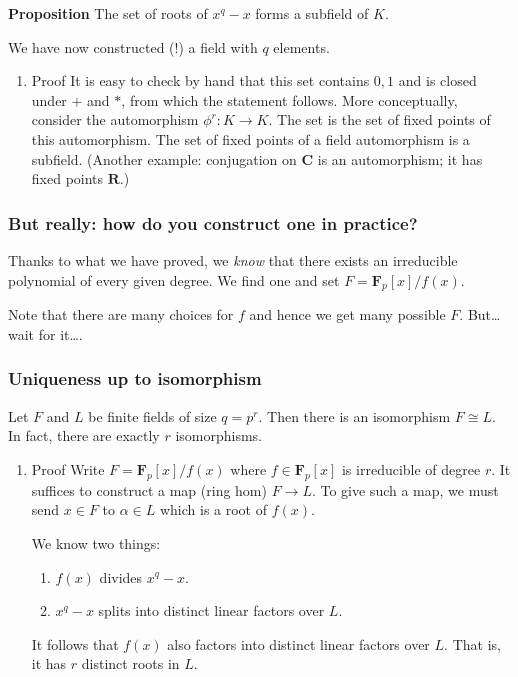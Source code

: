 \documentclass[11pt]{article}
\begin{document}
\textbf{\textbf{Proposition}} The set of roots of \(x^q-x\) forms a subfield of \(K\).

We have now constructed (!) a field with \(q\) elements.
\begin{enumerate}
\item Proof
\label{sec:org587a35f}
It is easy to check by hand that this set contains \(0,1\) and is closed under \(+\) and \(*\), from which the statement follows.
More conceptually, consider the automorphism \(\phi^r \colon K \to K\).  The set is the set of fixed points of this automorphism.
The set of fixed points of a field automorphism is a subfield.
(Another example: conjugation on \(\mathbf{C}\) is an automorphism; it has fixed points \(\mathbf{R}\).)
\end{enumerate}
\subsubsection{But really: how do you construct one in practice?}
\label{sec:orga20d96f}
Thanks to what we have proved, we \emph{know} that there exists an irreducible polynomial of every given degree.
We find one and set \(F = \mathbf{F}_p[x]/f(x)\).

Note that there are many choices for \(f\) and hence we get many possible \(F\).
But\ldots{} wait for it\ldots{}.
\subsubsection{Uniqueness up to isomorphism}
\label{sec:org5cd3526}
Let \(F\) and \(L\) be finite fields of size \(q = p^r\).
Then there is an isomorphism \(F \cong L\).
In fact, there are exactly \(r\) isomorphisms.
\begin{enumerate}
\item Proof
\label{sec:orgc567226}
Write \(F = \mathbf{F}_p[x]/f(x)\) where \(f \in \mathbf{F}_p[x]\) is irreducible of degree \(r\).
It suffices to construct a map (ring hom) \(F \to L\).
To give such a map, we must send \(x \in F\) to \(\alpha \in L\) which is a root of \(f(x)\).

We know two things:
\begin{enumerate}
\item \(f(x)\) divides \(x^q-x\).
\item \(x^q-x\) splits into distinct linear factors over \(L\).
\end{enumerate}
It follows that \(f(x)\) also factors into distinct linear factors over \(L\).
That is, it has \(r\) distinct roots in \(L\).
\end{enumerate}
\end{document}
